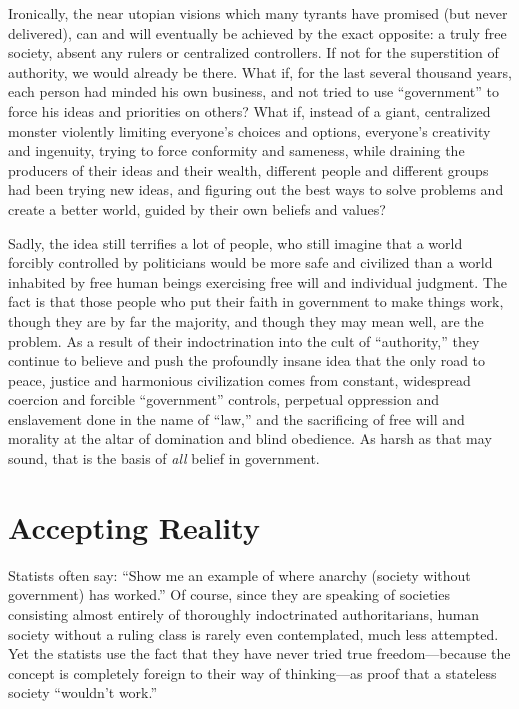 \documentclass{book}
\begin{document}
Ironically, the near utopian visions which many tyrants have promised (but never delivered), can and will eventually be achieved by the exact opposite: a truly free society, absent any rulers or centralized controllers. If not for the superstition of authority, we would already be there. What if, for the last several thousand years, each person had minded his own business, and not tried to use \enquote{government} to force his ideas and priorities on others? What if, instead of a giant, centralized monster violently limiting everyone's choices and options, everyone's creativity and ingenuity, trying to force conformity and sameness, while draining the producers of their ideas and their wealth, different people and different groups had been trying new ideas, and figuring out the best ways to solve problems and create a better world, guided by their own beliefs and values?

Sadly, the idea still terrifies a lot of people, who still imagine that a world forcibly controlled by politicians would be more safe and civilized than a world inhabited by free human beings exercising free will and individual judgment. The fact is that those people who put their faith in government to make things work, though they are by far the majority, and though they may mean well, are the problem. As a result of their indoctrination into the cult of \enquote{authority,} they continue to believe and push the profoundly insane idea that the only road to peace, justice and harmonious civilization comes from constant, widespread coercion and forcible \enquote{government} controls, perpetual oppression and enslavement done in the name of \enquote{law,} and the sacrificing of free will and morality at the altar of domination and blind obedience. As harsh as that may sound, that is the basis of \emph{all} belief in government.

\section{Accepting Reality}

Statists often say: \enquote{Show me an example of where anarchy (society without government) has worked.} Of course, since they are speaking of societies consisting almost entirely of thoroughly indoctrinated authoritarians, human society without a ruling class is rarely even contemplated, much less attempted. Yet the statists use the fact that they have never tried true freedom---because the concept is completely foreign to their way of thinking---as proof that a stateless society \enquote{wouldn't work.}
\end{document}
